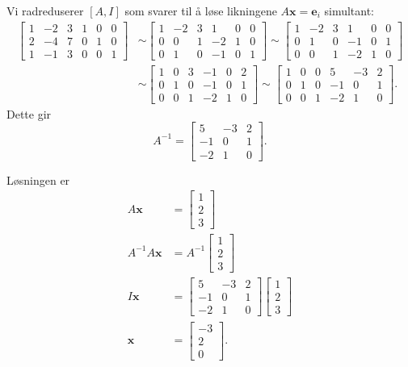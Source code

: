 \documentclass[notitlepage,a4paper,12pt,norsk]{IMFeksamen}
\newcommand{\V}[1]{\mathbf{#1}}
\newcommand{\vvv}[3]{\begin{bmatrix} #1 \\ #2 \\ #3 \end{bmatrix}}
\newcommand{\x}{\V{x}}
\newcommand{\0}{\V{0}}
\newcommand{\oppgslutt}{
\begin{center}
\pgfornament[width=6cm]{88}
\end{center}
}
\newenvironment{losning}{\begin{oppgave}}{\oppgslutt\end{oppgave}}
\begin{document}
\begin{losning}
Vi radreduserer $[A, I]$ som svarer til å løse likningene $A\x=\V{e}_i$ simultant: 
\begin{align*}
\begin{bmatrix}
1 & -2 & 3 & 1 & 0 & 0\\
2 & -4 & 7 & 0 & 1 & 0\\
1 & -1 & 3 & 0 & 0 & 1
\end{bmatrix}
&\sim
\begin{bmatrix}
1 & -2 & 3 & 1  & 0 & 0\\
0 & 0  & 1 & -2 & 1 & 0\\
0 & 1  & 0 & -1 & 0 & 1
\end{bmatrix}
\sim 
\begin{bmatrix}
1 & -2 & 3 & 1  & 0 & 0\\
0 & 1  & 0 & -1 & 0 & 1\\
0 & 0  & 1 & -2 & 1 & 0
\end{bmatrix}\\
&\sim
\begin{bmatrix}
1 & 0 & 3 & -1 & 0 & 2\\
0 & 1 & 0 & -1 & 0 & 1\\
0 & 0 & 1 & -2 & 1 & 0
\end{bmatrix}
\sim
\begin{bmatrix}
1 & 0 & 0 & 5  & -3 & 2\\
0 & 1 & 0 & -1 & 0  & 1\\
0 & 0 & 1 & -2 & 1  & 0
\end{bmatrix}.
\end{align*}
Dette gir
\[
A^{-1}=
\begin{bmatrix}
5  & -3 & 2\\
-1 & 0  & 1\\
-2 & 1  & 0
\end{bmatrix}.
\]

Løsningen er
\begin{align*}
A\x&=\vvv{1}{2}{3}\\
A^{-1}A\x&=A^{-1}\vvv{1}{2}{3}\\
I\x&=\begin{bmatrix}
5  & -3 & 2\\
-1 & 0  & 1\\
-2 & 1  & 0
\end{bmatrix}
\vvv{1}{2}{3}\\
\x&=\vvv{-3}{2}{0}.
\end{align*}
\end{losning}
\end{document}
